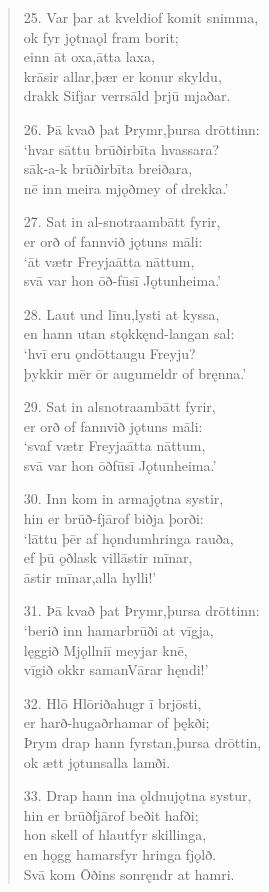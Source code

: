 \documentclass[12pt,letterpaper]{book}
\newcommand{\gap}[1][.25in]{\hspace{#1}}
\begin{document}
\begin{linenumbers}
\begin{verse}
25. Var þar at kveldi\gap of komit snimma,\\
ok fyr jǫtna\gap ǫl fram borit;\\
einn āt oxa,\gap ātta laxa,\\
krāsir allar,\gap þær er konur skyldu,\\
drakk Sifjar verr\gap sāld þrjū mjaðar.

26. Þā kvað þat Þrymr,\gap þursa drōttinn:\\
`hvar sāttu brūðir\gap bīta hvassara?\\
sāk-a-k brūðir\gap bīta breiðara,\\
nē inn meira mjǫð\gap mey of drekka.'

27. Sat in al-snotra\gap ambātt fyrir,\\
er orð of fann\gap við jǫtuns māli:\\
`āt vætr Freyja\gap ātta nāttum,\\
svā var hon ōð-fūs\gap ī Jǫtunheima.'

28. Laut und līnu,\gap lysti at kyssa,\\
en hann utan stǫkk\gap ęnd-langan sal:\\
`hvī eru ǫndōtt\gap augu Freyju?\\
þykkir mēr ōr augum\gap eldr of bręnna.'

29. Sat in alsnotra\gap ambātt fyrir,\\
er orð of fann\gap við jǫtuns māli:\\
`svaf vætr Freyja\gap ātta nāttum,\\
svā var hon ōðfūs\gap ī Jǫtunheima.'

30. Inn kom in arma\gap jǫtna systir,\\
hin er brūð-fjār\gap of biðja þorði:\\
`lāttu þēr af hǫndum\gap hringa rauða,\\
ef þū ǫðlask vill\gap āstir mīnar,\\
āstir mīnar,\gap alla hylli!'

31. Þā kvað þat Þrymr,\gap þursa drōttinn:\\
`berið inn hamar\gap brūði at vīgja,\\
lęggið Mjǫllni\gap ī meyjar knē,\\
vīgið okkr saman\gap Vārar hęndi!'

32. Hlō Hlōriða\gap hugr ī brjōsti,\\
er harð-hugaðr\gap hamar of þękði;\\
Þrym drap hann fyrstan,\gap þursa drōttin,\\
ok ætt jǫtuns\gap alla lamði.

33. Drap hann ina ǫldnu\gap jǫtna systur,\\
hin er brūðfjār\gap of beðit hafði;\\
hon skell of hlaut\gap fyr skillinga,\\
en hǫgg hamars\gap fyr hringa fjǫlð.\\
Svā kom Ōðins sonr\gap ęndr at hamri.
\end{verse}

\end{linenumbers}
\end{document}
